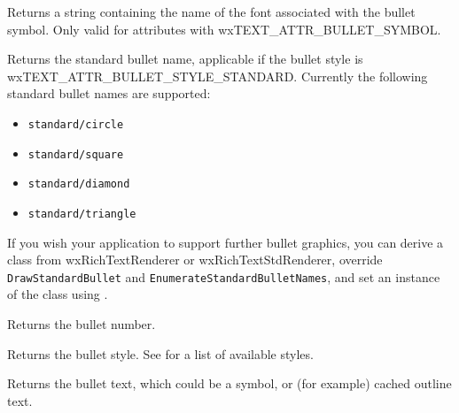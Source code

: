 \label{wxrichtextattrgetbulletfont}


Returns a string containing the name of the font associated with the bullet symbol.
Only valid for attributes with wxTEXT\_ATTR\_BULLET\_SYMBOL.

\label{wxrichtextattrgetbulletname}


Returns the standard bullet name, applicable if the bullet style is wxTEXT\_ATTR\_BULLET\_STYLE\_STANDARD.
Currently the following standard bullet names are supported:

\begin{itemize}\itemsep=0pt
\item {\tt standard/circle}
\item {\tt standard/square}
\item {\tt standard/diamond}
\item {\tt standard/triangle}
\end{itemize}

If you wish your application to support further bullet graphics, you can derive a
class from wxRichTextRenderer or wxRichTextStdRenderer, override {\tt DrawStandardBullet} and {\tt EnumerateStandardBulletNames}, and
set an instance of the class using .

\label{wxrichtextattrgetbulletnumber}


Returns the bullet number.

\label{wxrichtextattrgetbulletstyle}


Returns the bullet style.
See  for a list of available styles.

\label{wxrichtextattrgetbullettext}


Returns the bullet text, which could be a symbol, or (for example) cached outline text.

